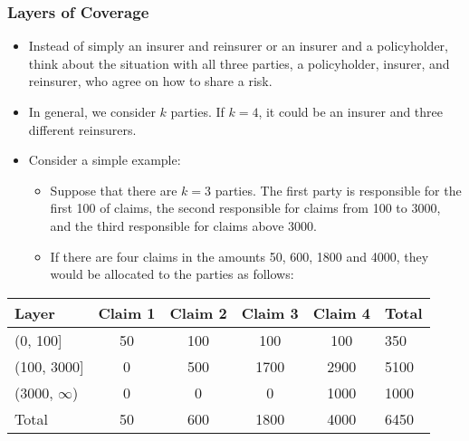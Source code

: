 \documentclass{beamer}
\begin{document}
\begin{frame}%
\frametitle{Layers of Coverage}
\begin{itemize}
\item Instead of simply an insurer and reinsurer or an insurer and a policyholder, think about the situation with all three parties, a policyholder, insurer, and reinsurer, who agree on how to share a risk.
\item In general, we consider $k$ parties. If $k=4$, it could be an insurer and three different reinsurers.
\item Consider a simple example:
\begin{itemize}
\item Suppose that there are $k=3$ parties. The first party is responsible for the first 100 of claims, the second responsible for claims from 100 to 3000, and the third responsible for claims above 3000.
\item If there are four claims in the amounts 50, 600, 1800 and 4000, they would be allocated to the parties as follows:
\end{itemize}
\end{itemize}
\begin{table}[H]
 \centering
    \begin{tabular}{l|cccc|l}
    \hline
 Layer          & Claim 1&  Claim 2 &  Claim 3 &  Claim 4 & Total \\ \hline
(0, 100]        & 50     &      100 &      100 &      100 &  350 \\
(100, 3000]     & 0      &      500 &     1700 &     2900 & 5100 \\
(3000, $\infty$)& 0      &      0   &        0 &     1000 & 1000 \\ \hline
Total & 50 & 600 & 1800 & 4000 & 6450 \\ \hline
    \end{tabular}
 \end{table}
\end{frame}
\end{document}
